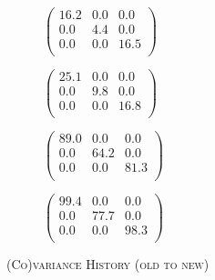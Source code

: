 \documentclass[english, master, utf8]{base/thesis_KBS}
\begin{document}
\begin{figure}[H]
    \begin{subfigure}[b]{0.24\textwidth}
    \centering
        $\left(
        \begin{array}{rrr}
        \boldsymbol{16.2} & 0.0 & 0.0 \\
        0.0 & \boldsymbol{4.4} & 0.0 \\
        0.0 & 0.0 & \boldsymbol{16.5} \\
        \end{array} \right) $
        \caption{\textsc{}}
        \label{fig:oldest}
    \end{subfigure}
    \hfill
    \begin{subfigure}[b]{0.24\textwidth}
    \centering
        $\left(
        \begin{array}{rrr}
        \boldsymbol{25.1} & 0.0 & 0.0 \\
        0.0 & \boldsymbol{9.8} & 0.0 \\
        0.0 & 0.0 & \boldsymbol{16.8} \\
        \end{array} \right) $
        \caption{\textsc{}}
        \label{fig:}
    \end{subfigure}
    \hfill
    \begin{subfigure}[b]{0.24\textwidth}
    \centering
        $\left(
        \begin{array}{rrr}
        \boldsymbol{89.0} & 0.0 & 0.0 \\
        0.0 & \boldsymbol{64.2} & 0.0 \\
        0.0 & 0.0 & \boldsymbol{81.3} \\
        \end{array} \right) $
        \caption{\textsc{}}
        \label{fig:}
    \end{subfigure}
    \hfill
    \begin{subfigure}[b]{0.24\textwidth}
    \centering
        $\left(
        \begin{array}{rrr}
        \boldsymbol{99.4} & 0.0 & 0.0 \\
        0.0 & \boldsymbol{77.7} & 0.0 \\
        0.0 & 0.0 & \boldsymbol{98.3} \\
        \end{array} \right) $
        \caption{\textsc{}}
        \label{fig:latest}
    \end{subfigure}
\caption{\textsc{(Co)variance History (old to new)}}
\label{fig:cov_history}
\end{figure}
\end{document}
